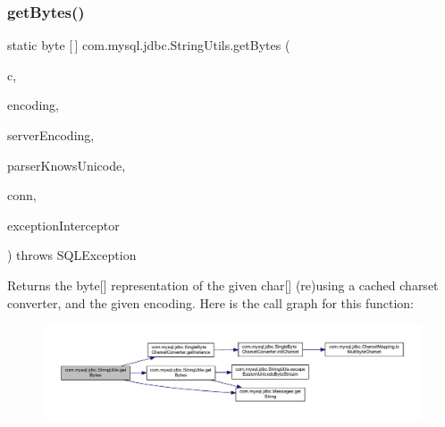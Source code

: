 \subsubsection{\texorpdfstring{get\+Bytes()}{getBytes()}\hspace{0.1cm}{\footnotesize\ttfamily [3/7]}}
{\footnotesize\ttfamily static byte \mbox{[}$\,$\mbox{]} com.\+mysql.\+jdbc.\+String\+Utils.\+get\+Bytes (\begin{DoxyParamCaption}\item[{char \mbox{[}$\,$\mbox{]}}]{c,  }\item[{String}]{encoding,  }\item[{String}]{server\+Encoding,  }\item[{boolean}]{parser\+Knows\+Unicode,  }\item[{\mbox{\hyperlink{interfacecom_1_1mysql_1_1jdbc_1_1_my_s_q_l_connection}{My\+S\+Q\+L\+Connection}}}]{conn,  }\item[{\mbox{\hyperlink{interfacecom_1_1mysql_1_1jdbc_1_1_exception_interceptor}{Exception\+Interceptor}}}]{exception\+Interceptor }\end{DoxyParamCaption}) throws S\+Q\+L\+Exception\hspace{0.3cm}{\ttfamily [static]}}

Returns the byte\mbox{[}\mbox{]} representation of the given char\mbox{[}\mbox{]} (re)using a cached charset converter, and the given encoding. Here is the call graph for this function\+:
\nopagebreak
\begin{figure}[H]
\begin{center}
\leavevmode
\includegraphics[width=350pt]{classcom_1_1mysql_1_1jdbc_1_1_string_utils_a4997696bd5f691e1bdfe5b41dec49be1_cgraph}
\end{center}
\end{figure}
\mbox{\label{classcom_1_1mysql_1_1jdbc_1_1_string_utils_a7ccf9deb162f278f270b455040e8aa03}} 
